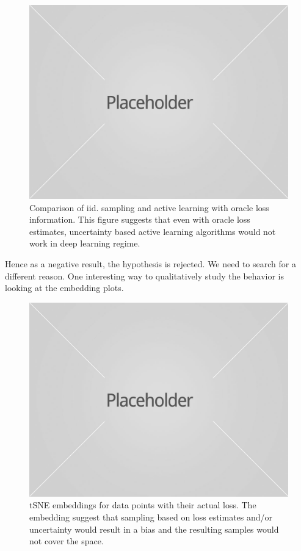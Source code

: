 \documentclass{article}
\begin{document}
\begin{figure}[ht]
\includegraphics[width=\columnwidth]{placeholder1.jpg}
\caption{Comparison of iid. sampling and active learning with oracle loss information. This figure suggests that even with oracle loss estimates, uncertainty based active learning algorithms would not work in deep learning regime.}
\end{figure}

Hence as a negative result, the hypothesis is rejected. We need to search for a different reason. One interesting way to qualitatively study the behavior is looking at the embedding plots.

\begin{figure}[ht]
\includegraphics[width=\columnwidth]{placeholder1.jpg}
\caption{tSNE embeddings for data points with their actual loss. The embedding suggest that sampling based on loss estimates and/or uncertainty would result in a bias and the resulting samples would not cover the space.}
\end{figure}
\end{document}
